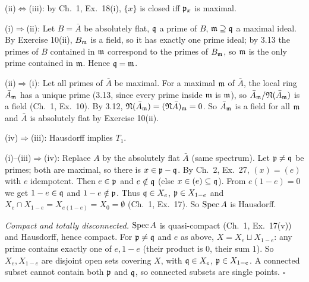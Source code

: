 \documentclass[11pt]{article}
\begin{document}
(ii)$\Leftrightarrow$(iii): by Ch.~1, Ex.~18(i), $\{x\}$ is closed iff $\mathfrak p_x$ is maximal.

(i)$\Rightarrow$(ii): Let $B=\bar A$ be absolutely flat, $\mathfrak q$ a prime of $B$, $\mathfrak m\supseteq\mathfrak q$ a maximal ideal. By Exercise 10(ii), $B_\mathfrak m$ is a field, so it has exactly one prime ideal; by 3.13 the primes of $B$ contained in $\mathfrak m$ correspond to the primes of $B_\mathfrak m$, so $\mathfrak m$ is the only prime contained in $\mathfrak m$. Hence $\mathfrak q=\mathfrak m$.

(ii)$\Rightarrow$(i): Let all primes of $\bar A$ be maximal. For a maximal $\mathfrak m$ of $\bar A$, the local ring $\bar A_\mathfrak m$ has a unique prime (3.13, since every prime inside $\mathfrak m$ is $\mathfrak m$), so $\bar A_\mathfrak m/\mathfrak N(\bar A_\mathfrak m)$ is a field (Ch.~1, Ex.~10). By 3.12, $\mathfrak N(\bar A_\mathfrak m)=(\mathfrak N\bar A)_\mathfrak m=0$. So $\bar A_\mathfrak m$ is a field for all $\mathfrak m$ and $\bar A$ is absolutely flat by Exercise 10(ii).

(iv)$\Rightarrow$(iii): Hausdorff implies $T_1$.

(i)--(iii)$\Rightarrow$(iv): Replace $A$ by the absolutely flat $\bar A$ (same spectrum). Let $\mathfrak p\ne\mathfrak q$ be primes; both are maximal, so there is $x\in\mathfrak p-\mathfrak q$. By Ch.~2, Ex.~27, $(x)=(e)$ with $e$ idempotent. Then $e\in\mathfrak p$ and $e\notin\mathfrak q$ (else $x\in(e)\subseteq\mathfrak q$). From $e(1-e)=0$ we get $1-e\in\mathfrak q$ and $1-e\notin\mathfrak p$. Thus $\mathfrak q\in X_e$, $\mathfrak p\in X_{1-e}$ and $X_e\cap X_{1-e}=X_{e(1-e)}=X_0=\emptyset$ (Ch.~1, Ex.~17). So $\operatorname{Spec} A$ is Hausdorff.

\emph{Compact and totally disconnected.} $\operatorname{Spec} A$ is quasi-compact (Ch.~1, Ex.~17(v)) and Hausdorff, hence compact. For $\mathfrak p\ne\mathfrak q$ and $e$ as above, $X=X_e\sqcup X_{1-e}$: any prime contains exactly one of $e,1-e$ (their product is $0$, their sum $1$). So $X_e,X_{1-e}$ are disjoint open sets covering $X$, with $\mathfrak q\in X_e$, $\mathfrak p\in X_{1-e}$. A connected subset cannot contain both $\mathfrak p$ and $\mathfrak q$, so connected subsets are single points. \hfill$\square$
\end{document}
